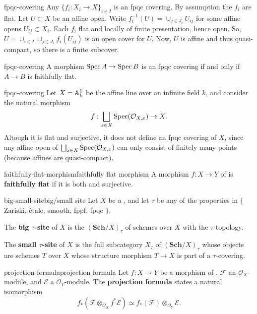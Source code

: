 \begin{example}{fpqc-covering}
    Any  $\{ f_i : X_i \to X \}_{i \in I}$ is an fpqc covering. By assumption the $f_i$ are flat. Let $U \subset X$ be an affine open. Write $f_i^{-1}(U) = \cup_{j \in J_i} U_{ij}$ for some affine opens $U_{ij} \subset X_i$. Each $f_i$ flat and locally of finite presentation, hence open. So, $U = \cup_{i \in I} \cup_{j \in J_i} f_i(U_{ij})$ is an open cover for $U$. Now, $U$ is affine and thus quasi-compact, so there is a finite subcover.
\end{example}

\begin{example}{fpqc-covering}
    A morphism $\Spec A \to \Spec B$ is an fpqc covering if and only if $A \to B$ is faithfully flat.
\end{example}

\begin{example}{fpqc-covering}
    Let $X = \AA^1_k$ be the affine line over an infinite field $k$, and consider the natural morphism
    \[ f : \bigsqcup_{x \in X} \Spec(\mathcal{O}_{X, x}) \to X . \]
    Altough it is flat and surjective, it does not define an fpqc covering of $X$, since any affine open of $\bigsqcup_{x \in X} \Spec(\mathcal{O}_{X, x})$ can only consist of finitely many points (because affines are quasi-compact).
\end{example}

\begin{topic}{faithfully-flat-morphism}{faithfully flat morphism}
    A morphism $f : X \to Y$ of  is \textbf{faithfully flat} if it is both  and surjective.
\end{topic}

\begin{topic}{big-small-site}{big/small site}
    Let $X$ be a , and let $\tau$ be any of the properties in $\{$ Zariski, étale, smooth, fppf, fpqc $\}$.
    
    The \textbf{big $\tau$-site} of $X$ is the  $(\textbf{Sch}/X)_\tau$ of schemes over $X$ with the $\tau$-topology.
    
    The \textbf{small $\tau$-site} of $X$ is the full subcategory $X_\tau$ of $(\textbf{Sch}/X)_\tau$ whose objects are schemes $T$ over $X$ whose structure morphism $T \to X$ is part of a $\tau$-covering.
\end{topic}

\begin{topic}{projection-formula}{projection formula}
    Let $f : X \to Y$ be a morphism of , $\mathcal{F}$ an $\mathcal{O}_X$-module, and $\mathcal{E}$ a  $\mathcal{O}_Y$-module. The \textbf{projection formula} states a natural isomorphism
    \[ f_*\left(\mathcal{F} \otimes_{\mathcal{O}_X} f^* \mathcal{E} \right) \simeq f_*\left(\mathcal{F}\right) \otimes_{\mathcal{O}_Y} \mathcal{E} . \]
\end{topic}


